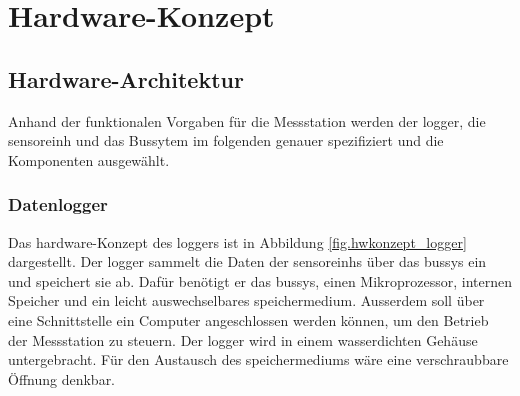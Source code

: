 %
%

\chapter{Hardware-Konzept}\label{chap.hardware}



\section{Hardware-Architektur}\label{sec.hw_arch}

Anhand der funktionalen Vorgaben für die Messstation werden der \gls{logger}, die \gls{sensoreinh} und das Bussytem im folgenden genauer spezifiziert und die Komponenten ausgewählt.

\subsection{Datenlogger}
Das \gls{hardware}-Konzept des \gls{logger}s ist in Abbildung \ref{fig.hwkonzept_logger} dargestellt.
Der \gls{logger} sammelt die Daten der \glspl{sensoreinh} über das \gls{bussys} ein und speichert sie ab. Dafür benötigt er das \gls{bussys}, einen Mikroprozessor, internen Speicher und ein leicht auswechselbares \gls{speichermedium}. Ausserdem soll über eine Schnittstelle ein Computer angeschlossen werden können, um den Betrieb der Messstation zu steuern. Der \gls{logger} wird in einem wasserdichten Gehäuse untergebracht. Für den Austausch des \gls{speichermedium}s wäre eine verschraubbare Öffnung denkbar.

